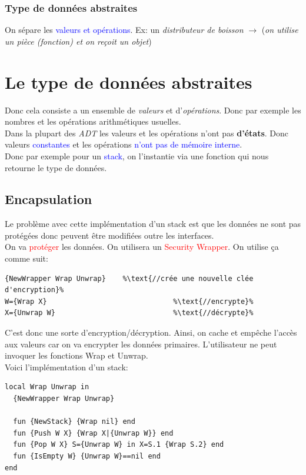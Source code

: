 \documentclass{report}
\begin{document}
\subsubsection{Type de données abstraites}
On sépare les \textcolor{blue}{valeurs et opérations}. Ex: un \textit{distributeur de boisson} $\rightarrow$ (\textit{on utilise un pièce (fonction) et on reçoit un objet})

\section{Le type de données abstraites}
Donc cela consiste a un ensemble de \textit{valeurs} et d'\textit{opérations}. Donc par exemple les nombres et les opérations arithmétiques usuelles.\\
Dans la plupart des \textit{ADT} les valeurs et les opérations n'ont pas \textbf{d'états}. Donc valeurs \textcolor{blue}{constantes} et les opérations \textcolor{blue}{n'ont pas de mémoire interne}.\\
Donc par exemple pour un \textcolor{blue}{stack}, on l'instantie via une fonction qui nous retourne le type de données.\\

\subsection{Encapsulation}
Le problème avec cette implémentation d'un stack est que les données ne sont pas protégées donc peuvent être modifiées outre les interfaces.\\

On va \textcolor{red}{protéger} les données. On utilisera un \textcolor{red}{Security Wrapper}. On utilise ça comme suit:
\begin{lstlisting}[escapechar=\%]
{NewWrapper Wrap Unwrap}	%\text{//crée une nouvelle clée d'encryption}%
W={Wrap X} 								%\text{//encrypte}%
X={Unwrap W} 							%\text{//décrypte}%
\end{lstlisting}
C'est donc une sorte d'encryption/décryption. Ainsi, on cache et empêche l'accès aux valeurs car on va encrypter les données primaires. L'utilisateur ne peut invoquer les fonctions Wrap et Unwrap.\\
Voici l'implémentation d'un stack:
\begin{lstlisting}[escapechar=\%]
local Wrap Unwrap in
  {NewWrapper Wrap Unwrap}

  fun {NewStack} {Wrap nil} end 
  fun {Push W X} {Wrap X|{Unwrap W}} end 
  fun {Pop W X} S={Unwrap W} in X=S.1 {Wrap S.2} end
  fun {IsEmpty W} {Unwrap W}==nil end
end
\end{lstlisting}
\end{document}
